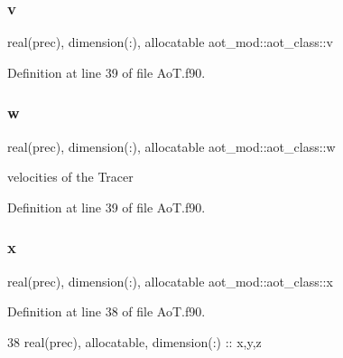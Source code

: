 \subsubsection{\texorpdfstring{v}{v}}
{\footnotesize\ttfamily real(prec), dimension(\+:), allocatable aot\+\_\+mod\+::aot\+\_\+class\+::v\hspace{0.3cm}{\ttfamily [private]}}



Definition at line 39 of file Ao\+T.\+f90.

\mbox{\label{structaot__mod_1_1aot__class_a6ec825475ad78b546b7067afec0d043f}} 
\subsubsection{\texorpdfstring{w}{w}}
{\footnotesize\ttfamily real(prec), dimension(\+:), allocatable aot\+\_\+mod\+::aot\+\_\+class\+::w\hspace{0.3cm}{\ttfamily [private]}}



velocities of the Tracer 



Definition at line 39 of file Ao\+T.\+f90.

\mbox{\label{structaot__mod_1_1aot__class_a4a72558d7ea656f16aca0126e6925725}} 
\subsubsection{\texorpdfstring{x}{x}}
{\footnotesize\ttfamily real(prec), dimension(\+:), allocatable aot\+\_\+mod\+::aot\+\_\+class\+::x\hspace{0.3cm}{\ttfamily [private]}}



Definition at line 38 of file Ao\+T.\+f90.


\begin{DoxyCode}
38         \textcolor{keywordtype}{real(prec)}, \textcolor{keywordtype}{allocatable}, \textcolor{keywordtype}{dimension(:)} :: x,y,z
\end{DoxyCode}
\mbox{\label{structaot__mod_1_1aot__class_a72bd4c6e0f45ae10286a4a179bda49f0}} 
